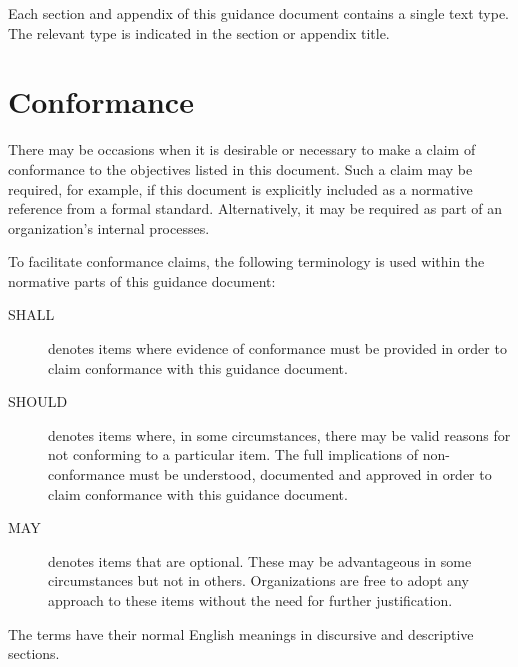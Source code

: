 Each section and appendix of this guidance document contains a single text type. The relevant type is indicated in the section or appendix title.

\section{Conformance}
There may be occasions when it is desirable or necessary to make a claim of conformance to the objectives listed in this document. Such a claim may be required, for example, if this document is explicitly included as a normative reference from a formal standard. Alternatively, it may be required as part of an organization's internal processes.

To facilitate conformance claims, the following terminology is used within the normative parts of this guidance document:
\begin{description}
	\item[SHALL] denotes items where evidence of conformance must be provided in order to claim conformance with this guidance document.
	\item[SHOULD] denotes items where, in some circumstances, there may be valid reasons for not conforming to a particular item. The full implications of non-conformance must be understood, documented and approved in order to claim conformance with this guidance document.
	\item[MAY] denotes items that are optional. These may be advantageous in some circumstances but not in others. Organizations are free to adopt any approach to these items without the need for further justification.
\end{description}

The terms have their normal English meanings in discursive and descriptive sections.
